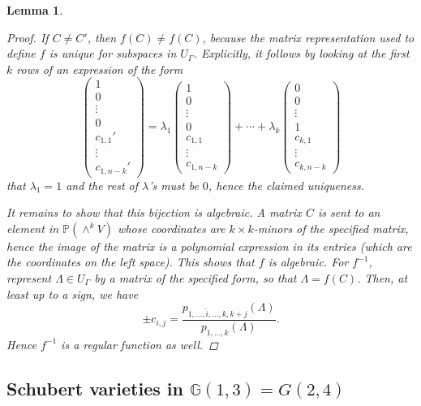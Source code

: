 \documentclass[12pt,a4paper]{amsart}
\theoremstyle{plain}
\newtheorem{lm}[thm]{Lemma}
\theoremstyle{definition}
\theoremstyle{remark}
\begin{document}
\begin{lm}
\begin{proof}
	If $C\neq C'$, then $f(C)\neq f(C)$, because the matrix representation used to define $f$ is unique for subspaces  in $U_{\Gamma}$.
	Explicitly, it follows by looking at the first $k$ rows of an expression of the form
	\[ \begin{pmatrix}
	    1 \\
	    0 \\
	    \vdots \\
	    0 \\
	    c_{1,1}' \\
	    \vdots \\
	    c_{1,n-k}'
	\end{pmatrix}
	=
	\lambda_{1}\begin{pmatrix}
	    1 \\
	    0 \\
	    \vdots \\
	    0 \\
	    c_{1,1} \\
	    \vdots \\
	    c_{1,n-k}
	\end{pmatrix}
	+
	\cdots
	+
	\lambda_{k}\begin{pmatrix}
	    0 \\
	    0 \\
	    \vdots \\
	    1 \\
	    c_{k,1} \\
	    \vdots \\
	    c_{k,n-k}
	\end{pmatrix}
	\]
	that $\lambda_{1}=1$ and the rest of $\lambda$'s must be $0$, hence the claimed uniqueness.

	It remains to show that this bijection is algebraic.
	A matrix $C$ is sent to an element in $\mathbb{P}(\wedge^{k}V)$ whose coordinates are $k\times k$-minors of the specified matrix, hence the image of the matrix is a polynomial expression in its entries (which are the coordinates on the left space).
	This shows that $f$ is algebraic.
	For $f^{-1}$, represent $\Lambda\in U_{\Gamma}$ by a matrix of the specified form, so that $\Lambda=f(C)$.
	Then, at least up to a sign, we have
	\[ \pm c_{i,j}=\frac{p_{1,\ldots,\hat{i},\ldots,k,k+j}(\Lambda)}{p_{1,\ldots,k}(\Lambda)}. \]
	Hence $f^{-1}$ is a regular function as well.
    \end{proof}
\end{lm}

\subsection{Schubert varieties in $\mathbb{G}(1,3)=G(2,4)$}
\end{document}
